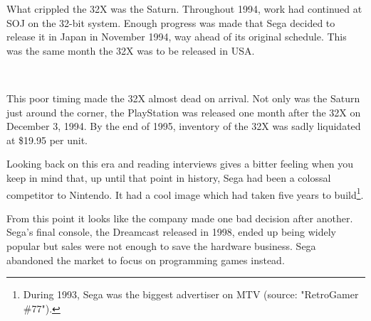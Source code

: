 What crippled the 32X was the Saturn. Throughout 1994, work had continued at SOJ on the 32-bit system. Enough progress was made that Sega decided to release it in Japan in November 1994, way ahead of its original schedule. This was the same month the 32X was to be released in USA.\\

\par

\\
 \par This poor timing made the 32X almost dead on arrival. Not only was the Saturn just around the corner, the  PlayStation was released one month after the 32X on December 3, 1994. By the end of 1995, inventory of the 32X was sadly liquidated at \$19.95 per unit.\\
\par
Looking back on this era and reading interviews gives a bitter feeling when you keep in mind that, up until that point in history, Sega had been a colossal competitor to Nintendo. It had a cool image which had taken five years to build\footnote{During 1993, Sega was the biggest advertiser on MTV (source: "RetroGamer \#77").}.\\
\par
 From this point it looks like the company made one bad decision after another. Sega's final console, the Dreamcast released in 1998, ended up being widely popular but sales were not enough to save the hardware business. Sega abandoned the market to focus on programming games instead.





